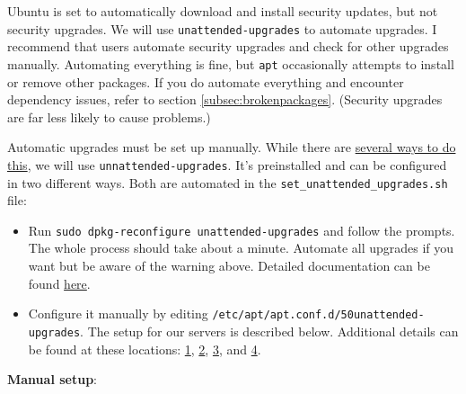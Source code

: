 Ubuntu is set to automatically download and install security updates, but not security upgrades. We will use \texttt{unattended-upgrades} to automate upgrades. I recommend that users automate security upgrades and check for other upgrades manually. Automating everything is fine, but \texttt{apt} occasionally attempts to install or remove other packages. If you do automate everything and encounter dependency issues, refer to section \ref{subsec:brokenpackages}. (Security upgrades are far less likely to cause problems.)

Automatic upgrades must be set up manually. While there are \href{https://help.ubuntu.com/community/AutomaticSecurityUpdates}{several ways to do this}, we will use \texttt{unnattended-upgrades}. It's preinstalled and can be configured in two different ways. Both are automated in the \texttt{set\_unattended\_upgrades.sh} file:

\begin{itemize}
\item Run \texttt{sudo dpkg-reconfigure unattended-upgrades} and follow the prompts. The whole process should take about a minute. Automate all upgrades if you want but be aware of the warning above. Detailed documentation can be found \href{https://help.ubuntu.com/lts/serverguide/automatic-updates.html}{here}.

\item Configure it manually by editing \texttt{/etc/apt/apt.conf.d/50unattended-upgrades}. The setup for our servers is described below. Additional details can be found at these locations:
\href{https://libre-software.net/ubuntu-automatic-updates/}{1}, 
\href{https://www.howtoforge.com/tutorial/how-to-setup-automatic-security-updates-on-ubuntu-1604/}{2}, 
\href{https://linoxide.com/ubuntu-how-to/enable-disable-unattended-upgrades-ubuntu-16-04/}{3}, and 
\href{https://www.linuxbabe.com/ubuntu/automatic-security-update-unattended-upgrades-ubuntu-18-04}{4}. 
\end{itemize}

\textbf{Manual setup}:

